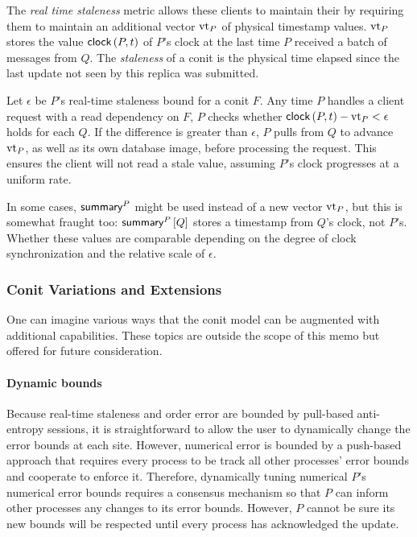 \documentclass[]             %
{NASA}                       %
\theoremstyle{definition}
\begin{document}
The \emph{real time staleness} metric allows these clients to maintain
their by requiring them to maintain an additional vector
$\vtphys{P}{}$ of physical timestamp values. $\vtphys{P}{Q}$ stores
the value $\clock{P,t}$ of $P$'s clock at the last time $P$ received a
batch of messages from $Q$. The \emph{staleness} of a conit is the
physical time elapsed since the last update not seen by this replica
was submitted.

Let $\epsilon$ be $P$'s real-time staleness bound for a conit $F$. Any
time $P$ handles a client request with a read dependency on $F$, $P$
checks whether $\clock{P,t} - \vtphys{P}{Q} < \epsilon$ holds for each
$Q$. If the difference is greater than $\epsilon$, $P$ pulls from $Q$
to advance $\vtphys{P}{Q}$, as well as its own database image, before
processing the request. This ensures the client will not read a stale
value, assuming $P$'s clock progresses at a uniform rate.

In some cases, $\summaryVec{P}$ might be used instead of a new vector
$\vtphys{P}{}$, but this is somewhat fraught too: $\summary{P}{Q}$
stores a timestamp from $Q$'s clock, not $P$'s. Whether these values
are comparable depending on the degree of clock synchronization and
the relative scale of $\epsilon$.

\subsubsection{Conit Variations and Extensions}
\label{sssec:conit-extensions}
One can imagine various ways that the conit model can be augmented
with additional capabilities. These topics are outside the scope of
this memo but offered for future consideration.

\paragraph{Dynamic bounds}
Because real-time staleness and order error are bounded by pull-based
anti-entropy sessions, it is straightforward to allow the user to
dynamically change the error bounds at each site. However, numerical
error is bounded by a push-based approach that requires every process
to be track all other processes' error bounds and cooperate to enforce
it. Therefore, dynamically tuning numerical $P$'s numerical error
bounds requires a consensus mechanism so that $P$ can inform other
processes any changes to its error bounds. However, $P$ cannot be sure
its new bounds will be respected until every process has acknowledged
the update.
\end{document}
